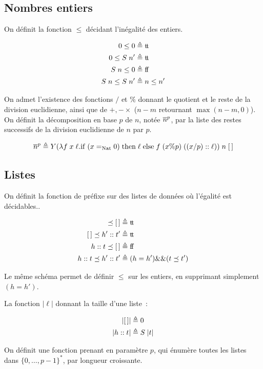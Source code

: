 \documentclass{article}
\begin{document}
\subsection{Nombres entiers}

On définit la fonction $\leq$ décidant l'inégalité des entiers.

\begin{align*}
    0 \leq 0 &\triangleq \mathrm{t}\!\mathrm{t} \\
    0 \leq S\;n' &\triangleq \mathrm{t}\!\mathrm{t} \\
    S\;n \leq 0 &\triangleq \mathrm{f}\!\mathrm{f} \\
    S\;n \leq S\;n' &\triangleq n \leq n'
\end{align*}

On admet l'existence des fonctions $/$ et $\%$ donnant le quotient et le reste de la division euclidienne, ainsi que de $+,-\times$ ($n-m$ retournant $\max(n-m,0)$). On définit la décomposition en base $p$ de $n$, notée $\overline{n}^{p}$, par la liste des restes successifs de la division euclidienne de $n$ par $p$.

\[\overline{n}^{p} \triangleq Y(\lambda f\;x\;\ell.\mathrm{if} \;(x =_{\mathrm{Nat}} 0) \;\mathrm{then} \;\ell\;\mathrm{else} \;f\;(x\%p)\;((x/p)::\ell))\;n\;[\,]\]

\subsection{Listes}

On définit la fonction de préfixe sur des listes de données où l'égalité est décidables..

\begin{align*}
    [\,]\preceq [\,] &\defeq \btt \\
    [\,]\preceq h'::t' &\defeq \btt \\
    h::t \preceq [\,] &\defeq \bff \\
    h::t \preceq h'::t' &\defeq (h = h') \&\& (t \preceq t')
\end{align*}

Le même schéma permet de définir $\leq$ sur les entiers, en supprimant simplement $(h = h')$.

La fonction $|\ell|$ donnant la taille d'une liste~:

\begin{align*}
    |[\,]| &\triangleq 0\\
    |h::t| &\triangleq S\;|t|
\end{align*}

On définit une fonction prenant en paramètre $p$, qui énumère toutes les listes dans $\{0,\ldots,p-1\}^*$, par longueur croissante.
\end{document}
